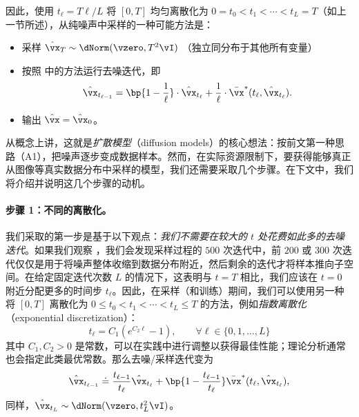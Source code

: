 \documentclass[../../book-main_zh.tex]{subfiles}
\begin{document}
因此，使用 \(t_{\ell} = T\ell / L\) 将 \([0, T]\) 均匀离散化为 \(0 = t_{0} < t_{1} < \cdots < t_{L}
= T\)（如上一节所述），从纯噪声中采样的一种可能方法是：
\begin{itemize}
    \item 采样 \(\hat{\vx}_{T} \sim \dNorm(\vzero, T^{2}\vI)\)
        （独立同分布于其他所有变量）
    \item 按照  中的方法运行去噪迭代，即
        \begin{equation}\label{eq:denoising-iteration-basic}
            \hat{\vx}_{t_{\ell - 1}} = \bp{1 -
            \frac{1}{\ell}}\cdot\hat{\vx}_{t_{\ell}} +
            \frac{1}{\ell}\cdot\bar{\vx}^{\ast}(t_{\ell}, \hat{\vx}_{t_{\ell}}).
        \end{equation}
    \item 输出 \(\hat{\vx} = \hat{\vx}_{0}\)。
\end{itemize}
从概念上讲，这就是\textit{扩散模型}（diffusion models）的核心想法：按前文第一种思路（A1），把噪声逐步变成数据样本。然而，在实际资源限制下，要获得能够真正从图像等真实数据分布中采样的模型，我们还需要采取几个步骤。在下文中，我们将介绍并说明这几个步骤的动机。

\paragraph{步骤 1：不同的离散化。} 我们采取的第一步是基于以下观点：\textit{我们不需要在较大的 \(t\) 处花费如此多的去噪迭代}。如果我们观察 ，我们会发现采样过程的 \(500\) 次迭代中，前 \(200\) 或 \(300\) 次迭代仅仅是用于将噪声整体收缩到数据分布附近，然后剩余的迭代才将样本推向子空间。在给定固定迭代次数 \(L\) 的情况下，这表明与 \(t = T\) 相比，我们应该在 \(t = 0\) 附近分配更多的时间步 \(t_{\ell}\)。因此，在采样（和训练）期间，我们可以使用另一种将 \([0, T]\) 离散化为 \(0 \leq
t_{0} < t_{1} < \cdots < t_{L} \leq T\) 的方法，例如\textit{指数离散化}（exponential discretization）：
\begin{equation}\label{eq:denoising_exponential_discretization}
    t_{\ell} = C_{1}(e^{C_{2}\ell} - 1), \qquad \forall \ell \in \{0,
    1, \dots, L\}
\end{equation}
其中 \(C_{1}, C_{2} > 0\) 是常数，可以在实践中进行调整以获得最佳性能；理论分析通常也会指定此类最优常数。那么去噪/采样迭代变为
\begin{equation}\label{eq:denoising_iteration}
    \hat{\vx}_{t_{\ell - 1}} \doteq \frac{t_{\ell -
    1}}{t_{\ell}}\hat{\vx}_{t_{\ell}} + \bp{1 - \frac{t_{\ell -
    1}}{t_{\ell}}}\bar{\vx}^{\ast}(t_{\ell}, \hat{\vx}_{t_{\ell}}),
\end{equation}
同样，\(\hat{\vx}_{t_{L}} \sim \dNorm(\vzero, t_{L}^{2}\vI)\)。
\end{document}
